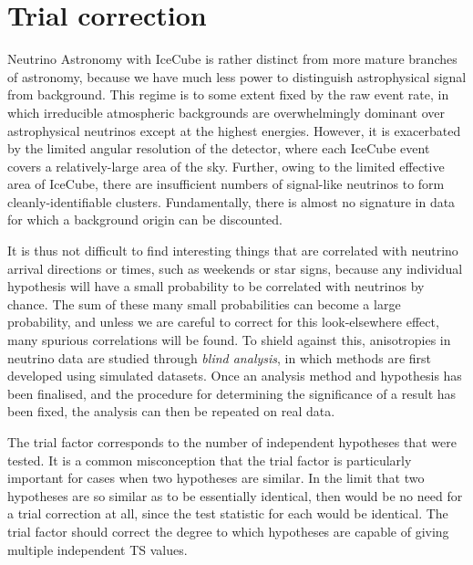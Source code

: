 \section{Trial correction}

Neutrino Astronomy with IceCube is rather distinct from more mature branches of astronomy, because we have much less power to distinguish astrophysical signal from background. This regime is to some extent fixed by the raw event rate, in which irreducible atmospheric backgrounds are overwhelmingly dominant over astrophysical neutrinos except at the highest energies. However, it is exacerbated by the limited angular resolution of the detector, where each IceCube event covers a relatively-large area of the sky. Further, owing to the limited effective area of IceCube, there are insufficient numbers of signal-like neutrinos to form cleanly-identifiable clusters. Fundamentally, there is almost no signature in data for which a background origin can be discounted.

It is thus not difficult to find interesting things that are correlated with neutrino arrival directions or times, such as weekends or star signs, because any individual hypothesis will have a small probability to be correlated with  neutrinos by chance. The sum of these many small probabilities can become a large probability, and unless we are careful to correct for this look-elsewhere effect, many spurious correlations will be found. To shield against this, anisotropies in neutrino data are studied through \emph{blind analysis}, in which methods are first developed using simulated datasets. Once an analysis method and hypothesis has been finalised, and the procedure for determining the significance of a result has been fixed, the analysis can then be repeated on real data.


The trial factor corresponds to the number of independent hypotheses that were tested. It is a common misconception that the trial factor is particularly important for cases when two hypotheses are similar. In the limit that two hypotheses are so similar as to be essentially identical, then would be no need for a trial correction at all, since the test statistic for each would be identical. The trial factor should correct the degree to which hypotheses are capable of giving multiple independent TS values.

